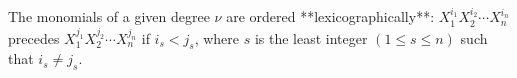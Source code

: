 The monomials of a given degree $\nu$ are ordered **lexicographically**: $X_1^{i_1} X_2^{i_2} \cdots X_n^{i_n}$ precedes $X_1^{j_1} X_2^{j_2} \cdots X_n^{j_n}$ if $i_s < j_s$, where $s$ is the least integer $(1 \leq s \leq n)$ such that $i_s \neq j_s$.
